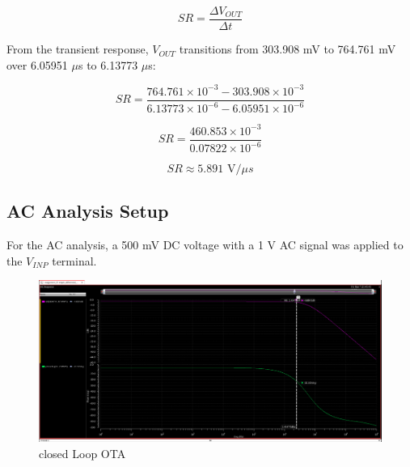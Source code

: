 \begin{equation}
    SR = \frac{\Delta V_{OUT}}{\Delta t}
\end{equation}

From the transient response, $V_{OUT}$ transitions from 303.908 mV to 764.761 mV over 6.05951 $\mu$s to 6.13773 $\mu$s:

\begin{equation}
    SR = \frac{764.761 \times 10^{-3} - 303.908 \times 10^{-3}}{6.13773  \times 10^{-6} - 6.05951 \times 10^{-6}}
\end{equation}

\begin{equation}
    SR = \frac{460.853 \times 10^{-3}}{0.07822 \times 10^{-6}}
\end{equation}

\begin{equation}
    SR \approx 5.891 \text{ V/} \mu s
\end{equation}

\subsection{AC Analysis Setup}


For the AC analysis, a 500 mV DC voltage with a 1 V AC signal was applied to the $V_{INP}$ terminal.
    \begin{figure}[h]
        \centering
           \includegraphics[width=1\textwidth]{images/single_ota_close_ac.png}
        \caption{closed Loop OTA}
        \label{fig: }
    \end{figure}





\endinput